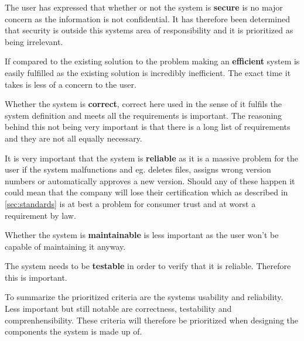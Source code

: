 The user has expressed that whether or not the system is \textbf{secure} is no major concern as the information is not confidential. It has therefore been determined that security is outside this systems area of responsibility and it is prioritized as being irrelevant.

If compared to the existing solution to the problem making an \textbf{efficient} system is easily fulfilled as the existing solution is incredibly inefficient. The exact time it takes is less of a concern to the user.

Whether the system is \textbf{correct}, correct here used in the sense of it fulfils the system definition and meets all the requirements is important. The reasoning behind this not being very important is that there is a long list of requirements and they are not all equally necessary.

It is very important that the system is \textbf{reliable} as it is a massive problem for the user if the system malfunctions and eg. deletes files, assigns wrong version numbers or automatically approves a new version. Should any of these happen it could mean that the company will lose their certification which as described in \ref{sec:standards} is at best a problem for consumer trust and at worst a requirement by law.

Whether the system is \textbf{maintainable} is less important as the user won't be capable of maintaining it anyway.
 
The system needs to be \textbf{testable} in order to verify that it is reliable. Therefore this is important.



To summarize the prioritized criteria are the systems usability and reliability. Less important but still notable are correctness, testability and comprenhensibility. These criteria will therefore be prioritized when designing the components the system is made up of. 